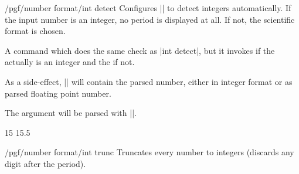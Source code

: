 \begin{key}{/pgf/number format/int detect}
    Configures |\pgfmathprintnumber| to detect integers automatically. If the
    input number is an integer, no period is displayed at all. If not, the
    scientific format is chosen.
\begin{codeexample}[pre={\begin{lateximage}},post={\end{lateximage}}]
\hspace{1em}
\hspace{1em}
\hspace{1em}
\hspace{1em}
\end{codeexample}
\end{key}

\begin{command}{\pgfmathifisint{}}
    A command which does the same check as |int detect|, but it invokes
     if the  actually is an integer and
    the  if not.

    As a side-effect, |\pgfretval| will contain the parsed number, either in
    integer format or as parsed floating point number.

    The argument  will be parsed with
    |\pgfmathfloatparsenumber|.
\begin{codeexample}[pre={\begin{lateximage}},post={\end{lateximage}}]
15 \hspace{1em}
15.5 
\end{codeexample}
\end{command}

\begin{key}{/pgf/number format/int trunc}
    Truncates every number to integers (discards any digit after the period).
\begin{codeexample}[pre={\begin{lateximage}},post={\end{lateximage}}]
\hspace{1em}
\hspace{1em}
\hspace{1em}
\hspace{1em}
\end{codeexample}
\end{key}

